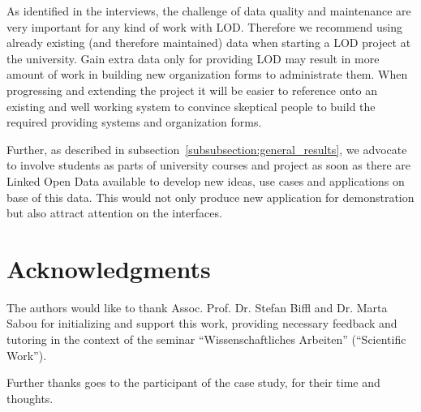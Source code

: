 As identified in the interviews, the challenge of data quality and maintenance are very important for any kind of work with LOD. Therefore we recommend using already existing (and therefore maintained) data when starting a LOD project at the university. Gain extra data only for providing LOD may result in more amount of work in building new organization forms to administrate them. When progressing and extending the project it will be easier to reference onto an existing and well working system to convince skeptical people to build the required providing systems and organization forms.

Further, as described in subsection~\ref{subsubsection:general_results}, we advocate to involve students as parts of university courses and project as soon as there are Linked Open Data available to develop new ideas, use cases and applications on base of this data. This would not only produce new application for demonstration but also attract attention on the interfaces.

\section{Acknowledgments}
The authors would like to thank Assoc. Prof. Dr. Stefan Biffl and Dr. Marta Sabou for initializing and support this work, providing necessary feedback and 	tutoring in the context of the seminar ``Wissenschaftliches Arbeiten'' (``Scientific Work'').

Further thanks goes to the participant of the case study, for their time and thoughts.
